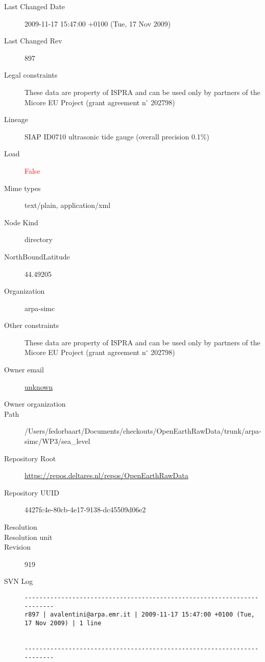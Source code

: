 \documentclass[9]{report}
\begin{document}
\begin{description}
  \item[Last Changed Date] 2009-11-17 15:47:00 +0100 (Tue, 17 Nov 2009)
  \item[Last Changed Rev] 897
  \item[Legal constraints] These data are property of ISPRA and can be used only by partners of the Micore EU Project (grant agreement n\mbox{$^\circ$} 202798)
  \item[Lineage] SIAP ID0710 ultrasonic tide gauge (overall precision 0.1\%)
  \item[Load] \textcolor{red}{False}
  \item[Mime types] text/plain, application/xml
  \item[Node Kind] directory
  \item[NorthBoundLatitude] 44.49205
  \item[Organization] arpa-simc
  \item[Other constraints] These data are property of ISPRA and can be used only by partners of the Micore EU Project (grant agreement n\mbox{$^\circ$} 202798)
  \item[Owner email] \href{mailto:unknown}{unknown}
  \item[Owner organization] 
  \item[Path] /Users/fedorbaart/Documents/checkouts/OpenEarthRawData/trunk/arpa-simc/WP3/sea\_level
  \item[Repository Root] \href{https://repos.deltares.nl/repos/OpenEarthRawData}{https://repos.deltares.nl/repos/OpenEarthRawData}
  \item[Repository UUID] 4427fc4e-80cb-4e17-9138-dc45509d06e2
  \item[Resolution] 
  \item[Resolution unit] 
  \item[Revision] 919
  \item[SVN Log] \begin{verbatim}
------------------------------------------------------------------------
r897 | avalentini@arpa.emr.it | 2009-11-17 15:47:00 +0100 (Tue, 17 Nov 2009) | 1 line


------------------------------------------------------------------------


\end{verbatim}
\end{description}
\end{document}
